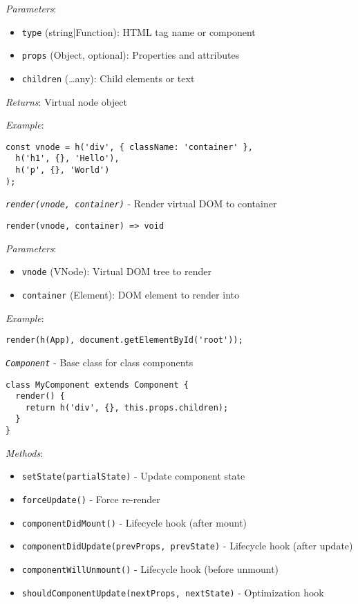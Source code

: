 \documentclass[11pt]{article}
\begin{document}
\emph{Parameters}:
\begin{itemize}
\item \texttt{type} (string|Function): HTML tag name or component
\item \texttt{props} (Object, optional): Properties and attributes
\item \texttt{children} (\ldots{}any): Child elements or text
\end{itemize}

\emph{Returns}: Virtual node object

\emph{Example}:
\begin{verbatim}
const vnode = h('div', { className: 'container' },
  h('h1', {}, 'Hello'),
  h('p', {}, 'World')
);
\end{verbatim}

\emph{\texttt{render(vnode, container)}} - Render virtual DOM to container

\begin{verbatim}
render(vnode, container) => void
\end{verbatim}

\emph{Parameters}:
\begin{itemize}
\item \texttt{vnode} (VNode): Virtual DOM tree to render
\item \texttt{container} (Element): DOM element to render into
\end{itemize}

\emph{Example}:
\begin{verbatim}
render(h(App), document.getElementById('root'));
\end{verbatim}

\emph{\texttt{Component}} - Base class for class components

\begin{verbatim}
class MyComponent extends Component {
  render() {
    return h('div', {}, this.props.children);
  }
}
\end{verbatim}

\emph{Methods}:
\begin{itemize}
\item \texttt{setState(partialState)} - Update component state
\item \texttt{forceUpdate()} - Force re-render
\item \texttt{componentDidMount()} - Lifecycle hook (after mount)
\item \texttt{componentDidUpdate(prevProps, prevState)} - Lifecycle hook (after update)
\item \texttt{componentWillUnmount()} - Lifecycle hook (before unmount)
\item \texttt{shouldComponentUpdate(nextProps, nextState)} - Optimization hook
\end{itemize}
\end{document}
